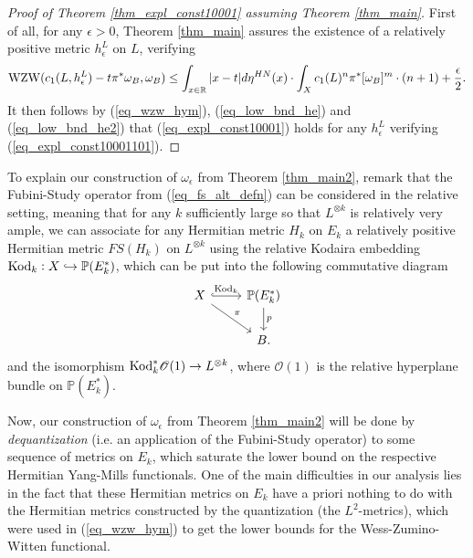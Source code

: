 \documentclass[12pt]{article}
\numberwithin{equation}{section}
\theoremstyle{theorem}
\theoremstyle{definition}
\theoremstyle{remark}
\newcommand{\real}{\mathbb{R}}
\begin{document}
	\begin{proof}[Proof of Theorem \ref{thm_expl_const10001} assuming Theorem \ref{thm_main}]
		First of all, for any $\epsilon > 0$, Theorem \ref{thm_main} assures the existence of a relatively positive metric $h^L_{\epsilon}$ on $L$, verifying
		\begin{equation}\label{eq_expl_const10001101}
			{\rm{WZW}}(c_1(L, h^L_{\epsilon}) - t \pi^* \omega_B, \omega_B) 
			\leq 
			\int_{x \in \real} |x - t| d \eta^{HN}(x)
			\cdot
			\int_X c_1(L)^n \pi^* [\omega_B]^m
			\cdot
			(n + 1) + \frac{\epsilon}{2}.
		\end{equation}
		It then follows by (\ref{eq_wzw_hym}), (\ref{eq_low_bnd_he}) and (\ref{eq_low_bnd_he2})  that (\ref{eq_expl_const10001}) holds for any $h^L_{\epsilon}$ verifying (\ref{eq_expl_const10001101}).
	\end{proof}
	\par 
	To explain our construction of $\omega_{\epsilon}$ from Theorem \ref{thm_main2}, remark that the Fubini-Study operator from (\ref{eq_fs_alt_defn}) can be considered in the relative setting, meaning that for any $k$ sufficiently large so that $L^{\otimes k}$ is relatively very ample, we can associate for any Hermitian metric $H_k$ on $E_k$ a relatively positive Hermitian metric $FS(H_k)$ on $L^{\otimes k}$ using the relative Kodaira embedding ${\rm{Kod}}_k : X \hookrightarrow \mathbb{P}(E_k^*)$, which can be put into the following commutative diagram
	\begin{equation}\label{eq_kod}
	\begin{tikzcd}
		X \arrow[hookrightarrow]{r}{{\rm{Kod}}_k} \arrow{rd}{\pi} & \mathbb{P}(E_k^*) \arrow{d}{p} \\
 		& B.
	\end{tikzcd}
	\end{equation}
	and the isomorphism ${\rm{Kod}}_k^* \mathscr{O}(1) \to L^{\otimes k}$, where $\mathscr{O}(1)$ is the relative hyperplane bundle on $\mathbb{P}(E_k^*)$.
	\par 
	Now, our construction of $\omega_{\epsilon}$ from Theorem \ref{thm_main2} will be done by \textit{dequantization} (i.e. an application of the Fubini-Study operator) to some sequence of metrics on $E_k$, which saturate the lower bound on the respective Hermitian Yang-Mills functionals.
	One of the main difficulties in our analysis lies in the fact that these Hermitian metrics on $E_k$ have a priori nothing to do with the Hermitian metrics constructed by the quantization (the $L^2$-metrics), which were used in (\ref{eq_wzw_hym}) to get the lower bounds for the Wess-Zumino-Witten functional.
\end{document}
